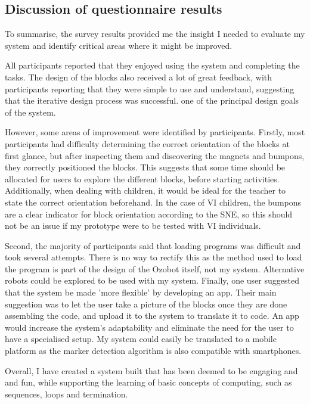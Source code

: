 \documentclass[oneside,%
                    author={Malak Hajji},
                    degree={BSc},
                    title={Designing An Accessible Computational Toolkit For Students},
                  subtitle={With Mixed Visual Abilities}]{dissertation}
\begin{document}
\subsection{Discussion of questionnaire results}
To summarise, the survey results provided me the insight I needed to evaluate my system and identify critical areas where it might be improved.

All participants reported that they enjoyed using the system and completing the tasks.  The design of the blocks also received a lot of great feedback, with participants reporting that they were simple to use and understand, suggesting that the iterative design process was successful. one of the principal design goals of the system. 

However, some areas of improvement were identified by participants.
Firstly, most participants had difficulty determining the correct orientation of the blocks at first glance, but after inspecting them and discovering the magnets and bumpons, they correctly positioned the blocks. This suggests that some time should be allocated for users to explore the different blocks, before starting activities. Additionally, when dealing with children, it would be ideal for the teacher to state the correct orientation beforehand. In the case of VI children, the bumpons are a clear indicator for block orientation according to the SNE, so this should not be an issue if my prototype were to be tested with VI individuals.

Second, the majority of participants said that loading programs was difficult and took several attempts. There is no way to rectify this as the method used to load the program is part of the design of the Ozobot itself, not my system. Alternative robots could be explored to be used with my system.
Finally, one user suggested that the system be made 'more flexible' by developing an app. Their main suggestion was to let the user take a picture of the blocks once they are done assembling the code, and upload it to the system to translate it to code. An app would increase the system's adaptability and eliminate the need for the user to have a specialised setup. My system could easily be translated to a mobile platform as the marker detection algorithm is also compatible with smartphones. 

Overall, I have created a system built that has been deemed to be engaging and and fun, while supporting the learning of basic concepts of computing, such as sequences, loops and termination.


\end{document}
